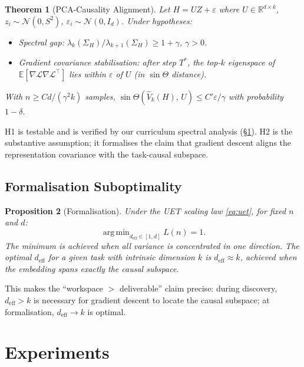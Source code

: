 \documentclass[10pt]{article}
\newcommand{\deff}{d_{\mathrm{eff}}}
\newcommand{\sinT}{\sin\Theta}
\DeclareMathOperator*{\argmin}{arg\,min}
\theoremstyle{plain}
\newtheorem{theorem}{Theorem}
\newtheorem{proposition}[theorem]{Proposition}
\theoremstyle{definition}
\theoremstyle{remark}
\begin{document}
\begin{theorem}[PCA-Causality Alignment]\label{thm:pca-causal}
Let $H = U Z + \varepsilon$ where $U \in \mathbb{R}^{d \times k}$,
$z_i \sim \mathcal{N}(0, S^2)$, $\varepsilon_i \sim \mathcal{N}(0, I_d)$.
Under hypotheses:
\begin{itemize}[leftmargin=1.5em,itemsep=1pt]
  \item[\textbf{H1}] \emph{Spectral gap}:
        $\lambda_k(\Sigma_H) / \lambda_{k+1}(\Sigma_H) \geq 1 + \gamma$,
        $\gamma > 0$.
  \item[\textbf{H2}] \emph{Gradient covariance stabilisation}: after step
        $T^*$, the top-$k$ eigenspace of $\mathbb{E}[\nabla\mathcal{L}
        \nabla\mathcal{L}^\top]$ lies within $\varepsilon$ of $U$ (in
        $\sinT$ distance).
\end{itemize}
With $n \geq C d / (\gamma^2 k)$ samples,
$\sinT(\hat V_k(H),\, U) \leq C' \varepsilon / \gamma$
with probability $1 - \delta$.
\end{theorem}

H1 is testable and is verified by our curriculum spectral analysis
(\S\ref{sec:experiments}).
H2 is the substantive assumption; it formalises the claim that gradient descent
aligns the representation covariance with the task-causal subspace.

\subsection{Formalisation Suboptimality}

\begin{proposition}[Formalisation]\label{prop:formalisation}
Under the UET scaling law \eqref{eq:uet}, for fixed $n$ and $d$:
\begin{equation}
  \argmin_{\deff \in [1,d]} L(n) = 1.
\end{equation}
The minimum is achieved when all variance is concentrated in one direction.
The optimal $\deff$ for a given task with intrinsic dimension $k$ is
$\deff \approx k$, achieved when the embedding spans exactly the causal
subspace.
\end{proposition}

This makes the ``workspace $>$ deliverable'' claim precise: during discovery,
$\deff > k$ is necessary for gradient descent to locate the causal subspace;
at formalisation, $\deff \to k$ is optimal.

\section{Experiments}
\label{sec:experiments}
\end{document}
